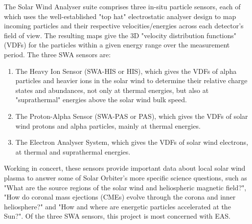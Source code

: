 The Solar Wind Analyser suite comprises three in-situ particle sensors, each of which uses the well-established "top hat" electrostatic analyser design\cite{collinson2010}\cite{owen2020} to map incoming particles and their respective velocities/energies across each detector's field of view. The resulting maps give the 3D "velocity distribution functions" (VDFs) for the particles within a given energy range over the measurement period. The three SWA sensors are: 

\begin{enumerate}
    \item The Heavy Ion Sensor (SWA-HIS or HIS), which gives the VDFs of alpha particles and heavier ions in the solar wind to determine their relative charge states and abundances, not only at thermal energies, but also at "suprathermal" energies above the solar wind bulk speed\cite{mason2023}.
    \item The Proton-Alpha Sensor (SWA-PAS or PAS), which gives the VDFs of solar wind protons and alpha particles, mainly at thermal energies.
    \item The Electron Analyser System, which gives the VDFs of solar wind electrons, at thermal and suprathermal energies.
\end{enumerate}

Working in concert, these sensors provide important data about local solar wind plasma to answer some of Solar Orbiter's more specific science questions, such as "What are the source regions of the solar wind and heliospheric magnetic field?", "How do coronal mass ejections (CMEs) evolve through the corona and inner heliosphere?" and "How and where are energetic particles accelerated at the Sun?"\cite{owen2020}. Of the three SWA sensors, this project is most concerned with EAS. 
\\

